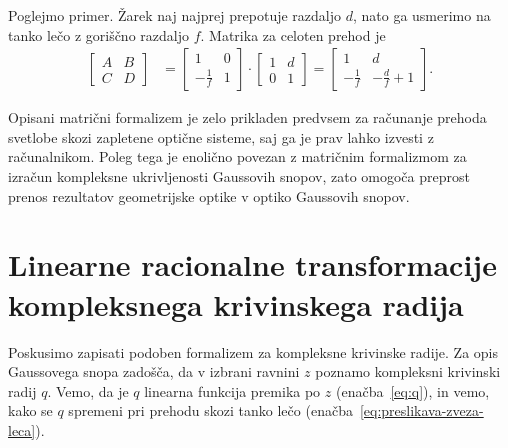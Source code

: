 Poglejmo primer. Žarek naj najprej prepotuje razdaljo $d$, nato ga usmerimo
na tanko lečo z goriščno razdaljo $f$. Matrika za celoten prehod je
\begin{align}
\left[\begin{array}{cc}
A & B\\
C & D
\end{array}\right] & =  \left[\begin{array}{cc}
1 & 0\\
-\frac{1}{f} & 1
\end{array}\right]\cdot\left[\begin{array}{cc}
1 & d\\
0 & 1
\end{array}\right] =  \left[\begin{array}{cc}
1 & d\\
-\frac{1}{f} & -\frac{d}{f}+1
\end{array}\right].
\label{eq:Mdf}
\end{align}
\begin{remark}
Opisani matrični formalizem je zelo prikladen predvsem za računanje prehoda
svetlobe skozi zapletene optične sisteme, saj ga je prav lahko izvesti z računalnikom. Poleg
tega je enolično povezan z matričnim formalizmom za izračun
kompleksne ukrivljenosti Gaussovih snopov, zato omogoča preprost prenos 
rezultatov geometrijske optike v optiko Gaussovih snopov.
\end{remark}

\section{Linearne racionalne transformacije kompleksnega krivinskega radija}

Poskusimo zapisati podoben formalizem za kompleksne krivinske
radije. Za opis Gaussovega snopa zadošča, da v izbrani ravnini $z$ poznamo kompleksni
krivinski radij $q$. Vemo, da je $q$ linearna funkcija
premika po $z$ (enačba~\ref{eq:q}), in vemo, kako se $q$ 
spremeni pri prehodu skozi tanko lečo (enačba~\ref{eq:preslikava-zveza-leca}). 

